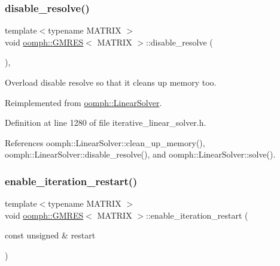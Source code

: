 \mbox{\label{classoomph_1_1GMRES_a5297a6d4f978e601989990eee1333b64}} 
\subsubsection{\texorpdfstring{disable\+\_\+resolve()}{disable\_resolve()}}
{\footnotesize\ttfamily template$<$typename M\+A\+T\+R\+IX $>$ \\
void \hyperlink{classoomph_1_1GMRES}{oomph\+::\+G\+M\+R\+ES}$<$ M\+A\+T\+R\+IX $>$\+::disable\+\_\+resolve (\begin{DoxyParamCaption}{ }\end{DoxyParamCaption})\hspace{0.3cm}{\ttfamily [inline]}, {\ttfamily [virtual]}}



Overload disable resolve so that it cleans up memory too. 



Reimplemented from \hyperlink{classoomph_1_1LinearSolver_ad61c63af94c5961830bd9807225a48d6}{oomph\+::\+Linear\+Solver}.



Definition at line 1280 of file iterative\+\_\+linear\+\_\+solver.\+h.



References oomph\+::\+Linear\+Solver\+::clean\+\_\+up\+\_\+memory(), oomph\+::\+Linear\+Solver\+::disable\+\_\+resolve(), and oomph\+::\+Linear\+Solver\+::solve().

\mbox{\label{classoomph_1_1GMRES_a95bf6049e720b55f13044704ade4c418}} 
\subsubsection{\texorpdfstring{enable\+\_\+iteration\+\_\+restart()}{enable\_iteration\_restart()}}
{\footnotesize\ttfamily template$<$typename M\+A\+T\+R\+IX $>$ \\
void \hyperlink{classoomph_1_1GMRES}{oomph\+::\+G\+M\+R\+ES}$<$ M\+A\+T\+R\+IX $>$\+::enable\+\_\+iteration\+\_\+restart (\begin{DoxyParamCaption}\item[{const unsigned \&}]{restart }\end{DoxyParamCaption})\hspace{0.3cm}{\ttfamily [inline]}}



